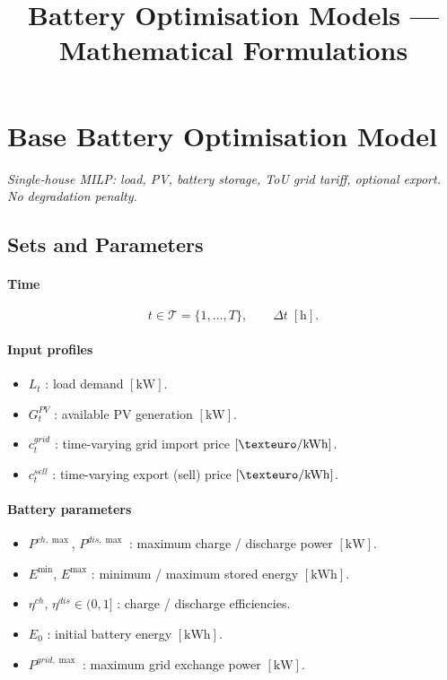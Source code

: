 \documentclass{article}
\title{Battery Optimisation Models — Mathematical Formulations}
\author{}
\date{}
\begin{document}
\maketitle
\tableofcontents
\newpage

\section{Base Battery Optimisation Model}
\label{sec:base}

\textit{Single-house MILP: load, PV, battery storage, ToU grid tariff,
optional export. No degradation penalty.}

\subsection{Sets and Parameters}

\paragraph{Time}
\[
  t \in \mathcal{T} = \{1, \dots, T\},
  \qquad
  \Delta t \;[\mathrm{h}].
\]

\paragraph{Input profiles}
\begin{itemize}
  \item $L_t$           : load demand $[\mathrm{kW}]$.
  \item $G^{PV}_t$      : available PV generation $[\mathrm{kW}]$.
  \item $c^{grid}_t$    : time-varying grid import price $[\texteuro/\mathrm{kWh}]$.
  \item $c^{sell}_t$    : time-varying export (sell) price $[\texteuro/\mathrm{kWh}]$.
\end{itemize}

\paragraph{Battery parameters}
\begin{itemize}
  \item $P^{ch,\max}$, $P^{dis,\max}$   : maximum charge / discharge power $[\mathrm{kW}]$.
  \item $E^{\min}$, $E^{\max}$           : minimum / maximum stored energy $[\mathrm{kWh}]$.
  \item $\eta^{ch}$, $\eta^{dis} \in (0,1]$ : charge / discharge efficiencies.
  \item $E_0$                             : initial battery energy $[\mathrm{kWh}]$.
  \item $P^{grid,\max}$                  : maximum grid exchange power $[\mathrm{kW}]$.
\end{itemize}
\end{document}
